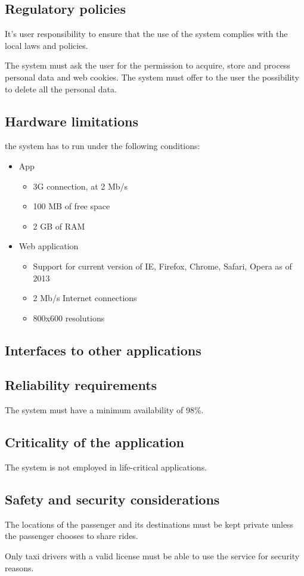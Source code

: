 \subsection{Regulatory policies}
It's user responsibility to ensure that the use of the system complies with the local laws and policies.

The system must ask the user for the permission to acquire, store and process personal data and web cookies. The system must offer to the user the possibility to delete all the personal data.

\subsection{Hardware limitations}
the system has to run under the following conditions:
\begin{itemize}
\item App
\begin{itemize}
\item 3G connection, at 2 Mb/s
\item 100 MB of free space
\item 2 GB of RAM
\end{itemize}
\item Web application
\begin{itemize}
\item Support for current version of IE, Firefox, Chrome, Safari, Opera as of 2013
\item 2 Mb/s Internet connections
\item 800x600 resolutions
\end{itemize}
\end{itemize}

\subsection{Interfaces to other applications}

\subsection{Reliability requirements}
The system must have a minimum availability of 98\%.

\subsection{Criticality of the application}
The system is not employed in life-critical applications.

\subsection{Safety and security considerations}
The locations of the passenger and its destinations must be kept private unless the passenger chooses to share rides.

Only taxi drivers with a valid license must be able to use the service for security reasons.
